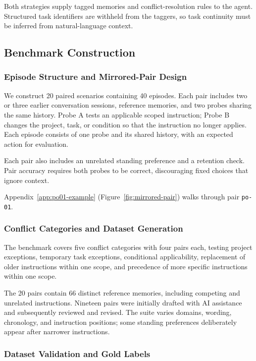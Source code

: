 Both strategies supply tagged memories and conflict-resolution
rules to the agent. Structured task identifiers are withheld
from the taggers, so task continuity must be inferred from
natural-language context.

\subsection{Benchmark Construction}
\label{sec:benchmark}

\subsubsection{Episode Structure and Mirrored-Pair Design}

We construct 20 paired scenarios containing 40 episodes.
Each pair includes two or three earlier conversation sessions,
reference memories, and two probes sharing the same history.
Probe A tests an applicable scoped instruction; Probe B
changes the project, task, or condition so that the instruction
no longer applies. Each episode consists of one probe and
its shared history, with an expected action for evaluation.

Each pair also includes an unrelated standing preference and
a retention check. Pair accuracy requires both probes to be
correct, discouraging fixed choices that ignore context.

Appendix~\ref{app:po01-example} (Figure~\ref{fig:mirrored-pair}) walks through pair \texttt{po-01}.

\subsubsection{Conflict Categories and Dataset Generation}

The benchmark covers five conflict categories with four
pairs each, testing project exceptions, temporary task
exceptions, conditional applicability, replacement of older
instructions within one scope, and precedence of more
specific instructions within one scope.

The 20 pairs contain 66 distinct reference memories,
including competing and unrelated instructions.
Nineteen pairs were initially drafted with AI assistance
and subsequently reviewed and revised. The suite varies
domains, wording, chronology, and instruction positions;
some standing preferences deliberately appear after
narrower instructions.

\subsubsection{Dataset Validation and Gold Labels}

